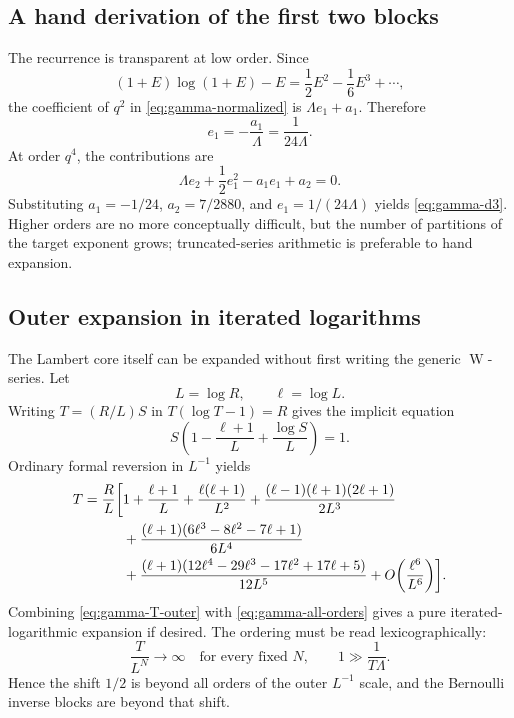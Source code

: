 \documentclass[11pt,oneside]{article}
\theoremstyle{plain}
\theoremstyle{definition}
\theoremstyle{remark}
\newcommand{\W}{\operatorname{W}}
\begin{document}
\subsection{A hand derivation of the first two blocks}

The recurrence is transparent at low order.  Since
\[
 (1+E)\log(1+E)-E=\frac12E^2-\frac16E^3+\cdots,
\]
the coefficient of \(q^2\) in \cref{eq:gamma-normalized} is
\(\Lambda e_1+a_1\).  Therefore
\[
 e_1=-\frac{a_1}{\Lambda}=\frac{1}{24\Lambda}.
\]
At order \(q^4\), the contributions are
\[
 \Lambda e_2+\frac12e_1^2-a_1e_1+a_2=0.
\]
Substituting \(a_1=-1/24\), \(a_2=7/2880\), and
\(e_1=1/(24\Lambda)\) yields \cref{eq:gamma-d3}.  Higher orders are no more
conceptually difficult, but the number of partitions of the target exponent
grows; truncated-series arithmetic is preferable to hand expansion.

\subsection{Outer expansion in iterated logarithms}
\label{sec:gamma-outer}

The Lambert core itself can be expanded without first writing the generic
\(\W\)-series.  Let
\begin{equation}
 L=\log R,
 \qquad \ell=\log L.
 \label{eq:gamma-L-ell}
\end{equation}
Writing \(T=(R/L)S\) in \(T(\log T-1)=R\) gives the implicit equation
\begin{equation}
 S\left(1-\frac{\ell+1}{L}+\frac{\log S}{L}\right)=1.
 \label{eq:gamma-S-equation}
\end{equation}
Ordinary formal reversion in \(L^{-1}\) yields
\begin{align}
 T=\frac{R}{L}\biggl[{}&1+\frac{\ell+1}{L}
 +\frac{\ell(\ell+1)}{L^2}
 +\frac{(\ell-1)(\ell+1)(2\ell+1)}{2L^3}
 \notag\\
 &+\frac{(\ell+1)(6\ell^3-8\ell^2-7\ell+1)}{6L^4}
 \notag\\
 &+\frac{(\ell+1)(12\ell^4-29\ell^3-17\ell^2+17\ell+5)}
 {12L^5}
 +O\!\left(\frac{\ell^6}{L^6}\right)
 \biggr].
 \label{eq:gamma-T-outer}
\end{align}
Combining \cref{eq:gamma-T-outer} with \cref{eq:gamma-all-orders} gives a
pure iterated-logarithmic expansion if desired.  The ordering must be read
lexicographically:
\begin{equation}
 \frac{T}{L^N}\longrightarrow\infty
 \quad\text{for every fixed }N,
 \qquad
 1\gg \frac1{T\Lambda}.
 \label{eq:gamma-hierarchy}
\end{equation}
Hence the shift \(1/2\) is beyond all orders of the outer \(L^{-1}\) scale,
and the Bernoulli inverse blocks are beyond that shift.
\end{document}

